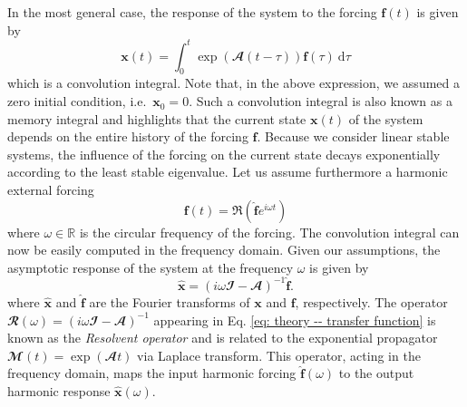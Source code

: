     In the most general case, the response of the system to the forcing $\mathbf{f}(t)$ is given by
    \begin{equation}
      \mathbf{x}(t) = \int_0^t \exp \left( \mathbfcal{A} (t-\tau) \right) \mathbf{f}(\tau) \ \mathrm{d}\tau
      \label{eq: theory -- convolution integral}
    \end{equation}
    which is a convolution integral. Note that, in the above expression, we assumed a zero initial condition, i.e.\ $\mathbf{x}_0 = 0$. Such a convolution integral is also known as a memory integral and highlights that the current state $\mathbf{x}(t)$ of the system depends on the entire history of the forcing $\mathbf{f}$. Because we consider linear stable systems, the influence of the forcing on the current state decays exponentially according to the least stable eigenvalue. Let us assume furthermore a harmonic external forcing
    \begin{equation}
      \mathbf{f}(t) = \Re \left( \hat{\mathbf{f}} e^{i \omega t} \right)
    \end{equation}
    where $\omega \in \mathbb{R}$ is the circular frequency of the forcing. The convolution integral can now be easily computed in the frequency domain. Given our assumptions, the asymptotic response of the system at the frequency $\omega$ is given by
    \begin{equation}
      \hat{\mathbf{x}} = \left( i \omega \mathbfcal{I} - \mathbfcal{A} \right)^{-1} \hat{\mathbf{f}}.
      \label{eq: theory -- transfer function}
    \end{equation}
    where $\hat{\mathbf{x}}$ and $\hat{\mathbf{f}}$ are the Fourier transforms of $\mathbf{x}$ and $\mathbf{f}$, respectively. The operator $\mathbfcal{R}(\omega) = \left( i \omega \mathbfcal{I} - \mathbfcal{A} \right)^{-1}$ appearing in Eq. \eqref{eq: theory -- transfer function} is known as the \emph{Resolvent operator} and is related to the exponential propagator $\mathbfcal{M}(t) = \exp \left( \mathbfcal{A} t \right)$ via Laplace transform. This operator, acting in the frequency domain, maps the input harmonic forcing $\hat{\mathbf{f}}(\omega)$ to the output harmonic response $\hat{\mathbf{x}}(\omega)$.

